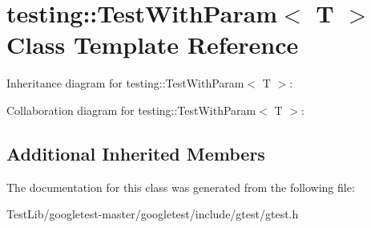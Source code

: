 \hypertarget{classtesting_1_1TestWithParam}{}\section{testing\+:\+:Test\+With\+Param$<$ T $>$ Class Template Reference}
\label{classtesting_1_1TestWithParam}


Inheritance diagram for testing\+:\+:Test\+With\+Param$<$ T $>$\+:


Collaboration diagram for testing\+:\+:Test\+With\+Param$<$ T $>$\+:
\subsection*{Additional Inherited Members}


The documentation for this class was generated from the following file\+:\begin{DoxyCompactItemize}
\item 
Test\+Lib/googletest-\/master/googletest/include/gtest/gtest.\+h\end{DoxyCompactItemize}
